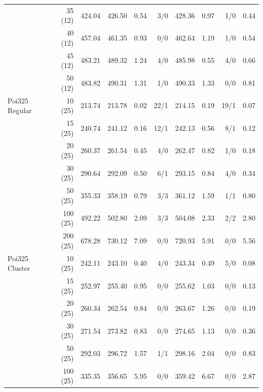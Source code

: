 \documentclass[preprint,review,12pt,authoryear]{elsarticle}
\begin{document}
\begin{table}[p]
{\begin{tabular}{lr r rrr rrr r}
       & 35 (12) & 424.04 & 426.50 & 0.54 & 3/0 & 428.36 & 0.97 & 1/0 & 0.44 \\
       & 40 (12) & 457.04 & 461.35 & 0.93 & 0/0 & 462.64 & 1.19 & 1/0 & 0.54 \\
       & 45 (12) & 483.21 & 489.32 & 1.24 & 4/0 & 485.98 & 0.55 & 4/0 & 0.66 \\
       & 50 (12) & 483.82 & 490.31 & 1.31 & 1/0 & 490.33 & 1.33 & 0/0 & 0.81 \\
\midrule
Poi325 Regular & 10 (25) & 213.74 & 213.78 & 0.02 & 22/1 & 214.15 & 0.19 & 19/1 & 0.07 \\
               & 15 (25) & 240.74 & 241.12 & 0.16 & 12/1 & 242.13 & 0.56 & 8/1 & 0.12 \\
               & 20 (25) & 260.37 & 261.54 & 0.45 & 4/0 & 262.47 & 0.82 & 1/0 & 0.18 \\
               & 30 (25) & 290.64 & 292.09 & 0.50 & 6/1 & 293.15 & 0.84 & 4/0 & 0.34 \\
               & 50 (25) & 355.33 & 358.19 & 0.79 & 3/3 & 361.12 & 1.59 & 1/1 & 0.80 \\
               & 100 (25) & 492.22 & 502.80 & 2.09 & 3/3 & 504.08 & 2.33 & 2/2 & 2.80 \\
               & 200 (25) & 678.28 & 730.12 & 7.09 & 0/0 & 720.93 & 5.91 & 0/0 & 5.56 \\
\midrule
Poi325 Cluster & 10 (25) & 242.11 & 243.10 & 0.40 & 4/0 & 243.34 & 0.49 & 5/0 & 0.08 \\
               & 15 (25) & 252.97 & 255.40 & 0.95 & 0/0 & 255.62 & 1.03 & 0/0 & 0.13 \\
               & 20 (25) & 260.34 & 262.54 & 0.84 & 0/0 & 263.67 & 1.26 & 0/0 & 0.19 \\
               & 30 (25) & 271.54 & 273.82 & 0.83 & 0/0 & 274.65 & 1.13 & 0/0 & 0.36 \\
               & 50 (25) & 292.03 & 296.72 & 1.57 & 1/1 & 298.16 & 2.04 & 0/0 & 0.83 \\
               & 100 (25) & 335.35 & 356.65 & 5.95 & 0/0 & 359.42 & 6.67 & 0/0 & 2.87 \\
\bottomrule
\end{tabular}}
\end{table}



\end{document}
